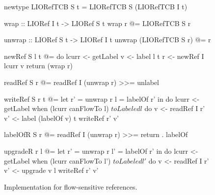 \begin{figure}
\begin{code}
newtype LIORefTCB S t = LIORefTCB S (LIORefTCB I t)

wrap :: LIORef I t -> LIORef S t
wrap r @= LIORefTCB S r

unwrap :: LIORef S t -> LIORef I t
unwrap (LIORefTCB S r) @= r

newRef S l t @= do
  lcurr  <- getLabel
  v      <- label l t
  r      <- newRef I lcurr v
  return (wrap r)


readRef S r @= readRef I (unwrap r) >>= unlabel


writeRef S r t @= let  r'  = unwrap r
                       l   = labelOf r' in do
  lcurr <- getLabel
  when (lcurr canFlowTo l) $ toLabeled l $ do
     v   <- readRef I r'
     v'  <- label (labelOf v) t
     writeRef r' v'


labelOfR S r @= readRef I (unwrap r) >>= return . labelOf

upgradeR r l @= let  r'  = unwrap r
                     l'  = labelOf r' in do
  lcurr <- getLabel
  when (lcurr canFlowTo l') $ toLabeled l' $ do
     v   <- readRef I r'
     v'  <- upgrade v l
     writeRef r' v'

\end{code}
\caption{Implementation for flow-sensitive references.\label{fig:fs-exts-semantics-impl}}
\end{figure}

%
%


